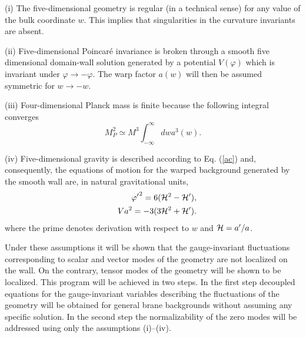 \documentclass[a4paper,12pt]{article}
\begin{document}
(i) The five-dimensional geometry is regular (in a technical sense)
for any value of the bulk coordinate $w$. This implies that singularities 
in the curvature invariants are absent.

(ii) Five-dimensional Poincar\'e invariance is broken 
through a smooth five dimensional domain-wall solution generated 
by a potential $V(\varphi)$ which is invariant under 
$\varphi \rightarrow - \varphi$. The warp factor $a(w)$ will 
then be assumed symmetric for $w\rightarrow - w$.

(iii) Four-dimensional Planck mass is finite because the following integral
converges
\begin{equation}
M^2_{P} \simeq M^3 \int_{-\infty}^{\infty} dw a^3(w).
\label{pl}
\end{equation}

(iv) Five-dimensional gravity is described according to Eq. (\ref{ac}) 
and, consequently, the equations of motion for the warped background 
generated by the smooth wall are, in natural gravitational units, 
\begin{eqnarray}
&&{\varphi'}^2 = 6 ( {\cal H}^2 - {\cal H}'), 
\label{c1}\\
&& Va^2 = - 3 ( 3 {\cal H}^2 + {\cal H}').
\label{c2}
\end{eqnarray}
where the prime denotes derivation with respect to $w$ and ${\cal H} = a'/a$.

Under these assumptions it will be shown that the gauge-invariant 
fluctuations corresponding to scalar and vector modes of the geometry 
are not localized on the wall. On the contrary, tensor modes of the geometry 
will be shown to be localized. This program will be achieved in two steps. 
In the first step decoupled equations for the gauge-invariant 
variables describing the fluctuations of the geometry will be obtained 
for general brane backgrounds
without assuming any specific solution.
In the second step the normalizability of the zero modes will be  
addressed using only the assumptions (i)--(iv).
\end{document}
